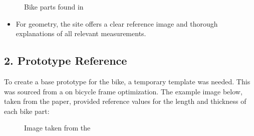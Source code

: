 \documentclass[letterpaper,10pt,english]{jupyterBook}
\begin{document}
\begin{figure}[htbp]
\centering
\capstart

\noindent{}
\caption{Bike parts found in }\label{\detokenize{Research:bike-parts}}\end{figure}
\begin{itemize}
\item {} 
\sphinxAtStartPar
{} For geometry, the site  offers a clear reference image and thorough explanations of all relevant measurements.

\end{itemize}


\subsection{2. Prototype Reference}
\label{\detokenize{Research:prototype-reference}}
\sphinxAtStartPar
To create a base prototype for the bike, a temporary template was needed. This was sourced from a  on bicycle frame optimization. The example image below, taken from the paper, provided reference values for the length and thickness of each bike part:

\begin{figure}[htbp]
\centering
\capstart

\noindent{}
\caption{Image taken from the }\label{\detokenize{Research:bike-reference}}\end{figure}
\end{document}
